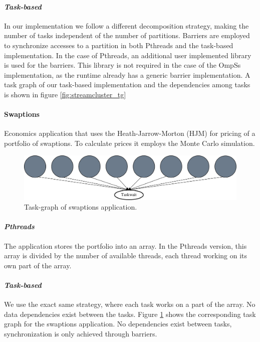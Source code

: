 {\paragraph{\textit{Task-based}}
In our implementation we follow a different decomposition strategy, making the number of tasks independent
of the number of partitions.   
Barriers are employed to synchronize accesses
to a partition in both Pthreads and the task-based implementation. 
In the case of Pthreads, an additional user 
implemented library is used for the barriers. 
This library is not required in the case of the OmpSs implementation, as 
the runtime already has a generic barrier implementation.
A task graph of our task-based implementation and the dependencies among tasks is shown in figure \ref{fig:streamcluster_tg}

\paragraph{\textbf{Swaptions}}
Economics application that uses the Heath-Jarrow-Morton (HJM)\cite{RePEc:ecm:emetrp:v:60:y:1992:i:1:p:77-105} for pricing of a portfolio of swaptions. To calculate prices it employs the Monte Carlo simulation.

\begin{figure}[ht!]%
	\center
	\includegraphics[width=.8\columnwidth]{task_benchmarks/figures/swaptions_taskgraph}%
	\caption{Task-graph of swaptions application.}
	\label{fig:swaptions_tg}%
	\vspace{.5cm}
\end{figure}


\paragraph{\textit{Pthreads}}
The application stores the portfolio into an array. In the Pthreads version, this array is divided by the number of available threads, each thread working on its own part of the array. 

\paragraph{\textit{Task-based}}
We use the exact same strategy, where each task works on a part of the array.  No data dependencies exist between the tasks.
Figure \ref{fig:swaptions_tg} shows the corresponding task graph for the swaptions application.  No dependencies exist between tasks,
synchronization is only achieved through barriers.


}
